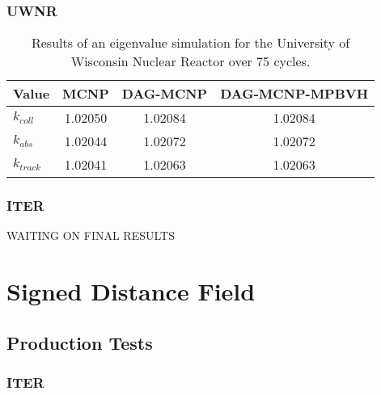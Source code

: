   \subsubsection{UWNR}

  
  \begin{table}
    \small
    \begin{center}
      \begin{tabular}{lccc}
        \toprule
        Value     & MCNP    & DAG-MCNP & DAG-MCNP-MPBVH \\
        \toprule
        $k_{coll}$  & 1.02050 & 1.02084  & 1.02084        \\
        $k_{abs}$   & 1.02044 & 1.02072  & 1.02072        \\
        $k_{track}$ & 1.02041 & 1.02063  & 1.02063        \\
        \bottomrule
      \end{tabular}
    \end{center}
    \caption[Results of eigenvalue simulations in UWNR for various DAG-MCNP
      implementations.]{Results of an eigenvalue simulation for the University
      of Wisconsin Nuclear Reactor over 75 cycles.}
  \end{table}


  \subsubsection{ITER}
  WAITING ON FINAL RESULTS

\section{Signed Distance Field}

\subsection{Production Tests}

\subsubsection{ITER}

